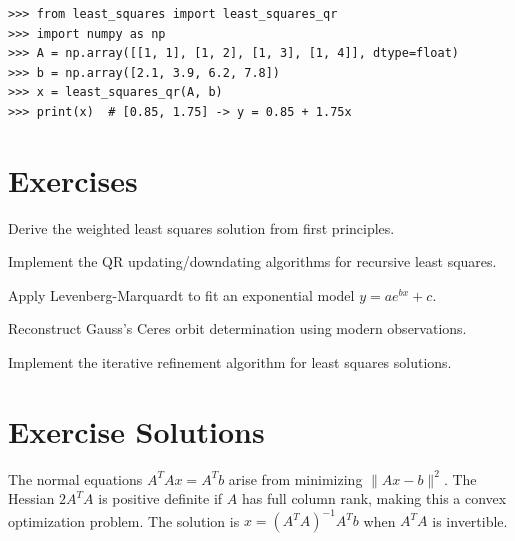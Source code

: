 \begin{example}
\begin{lstlisting}[style=python]
>>> from least_squares import least_squares_qr
>>> import numpy as np
>>> A = np.array([[1, 1], [1, 2], [1, 3], [1, 4]], dtype=float)
>>> b = np.array([2.1, 3.9, 6.2, 7.8])
>>> x = least_squares_qr(A, b)
>>> print(x)  # [0.85, 1.75] -> y = 0.85 + 1.75x
\end{lstlisting}
\end{example}

\section{Exercises}

\begin{exercise}
Derive the weighted least squares  solution from first principles.
\end{exercise}

\begin{exercise}
Implement the QR updating/downdating algorithms for recursive least squares.
\end{exercise}

\begin{exercise}
Apply Levenberg-Marquardt to fit an exponential model $y = a e^{bx} + c$.
\end{exercise}

\begin{exercise}
Reconstruct Gauss's Ceres orbit determination  using modern observations.
\end{exercise}

\begin{exercise}
Implement the iterative refinement algorithm for least squares solutions.
\end{exercise}



\section{Exercise Solutions}

\begin{solution}
The normal equations $A^TAx = A^Tb$ arise from minimizing $\|Ax - b\|^2$. The Hessian $2A^TA$ is positive definite if $A$ has full column rank, making this a convex optimization problem. The solution is $x = (A^TA)^{-1}A^Tb$ when $A^TA$ is invertible.
\end{solution}


